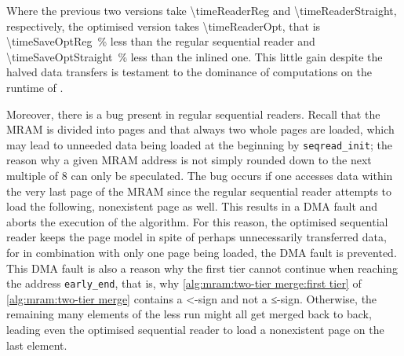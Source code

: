 Where the previous two versions take \qty[exponent-mode=fixed, fixed-exponent=9, round-mode=places, round-precision=2]{\timeReaderReg}{\cycle} and \qty[exponent-mode=fixed, fixed-exponent=9, round-mode=places, round-precision=2]{\timeReaderStraight}{\cycle}, respectively, the optimised version takes \qty[exponent-mode=fixed, fixed-exponent=9, round-mode=places, round-precision=2]{\timeReaderOpt}{\cycle}, that is \qty[round-mode=places, round-precision=0]{\timeSaveOptReg}{\percent} less than the regular sequential reader and \qty[round-mode=places, round-precision=0]{\timeSaveOptStraight}{\percent} less than the inlined one.
This little gain despite the halved data transfers is testament to the dominance of computations on the runtime of \MS{}.

Moreover, there is a bug present in regular sequential readers.
Recall that the MRAM is divided into pages and that always two whole pages are loaded, which may lead to unneeded data being loaded at the beginning by \lstinline|seqread_init|;
the reason why a given MRAM address is not simply rounded down to the next multiple of 8 can only be speculated.
The bug occurs if one accesses data within the very last page of the MRAM since the regular sequential reader attempts to load the following, nonexistent page as well.
This results in a DMA fault and aborts the execution of the algorithm.
For this reason, the optimised sequential reader keeps the page model in spite of perhaps unnecessarily transferred data, for in combination with only one page being loaded, the DMA fault is prevented.
This DMA fault is also a reason why the first tier cannot continue when reaching the address \lstinline|early_end|, that is, why \cref{alg:mram:two-tier merge:first tier} of \cref{alg:mram:two-tier merge} contains a <-sign and not a ≤-sign.
Otherwise, the remaining \unrollfactor{} many elements of the less run might all get merged back to back, leading even the optimised sequential reader to load a nonexistent page on the last element.
